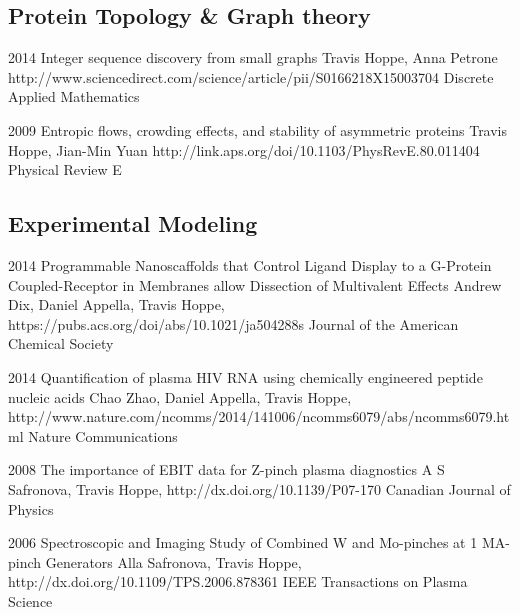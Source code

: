 \documentclass[]{scrartcl}
\begin{document}
\begin{cleanCV}

\subsection{Protein Topology \& Graph theory}

\Paper
{2014}
{Integer sequence discovery from small graphs}
{Travis Hoppe, Anna Petrone}
{http://www.sciencedirect.com/science/article/pii/S0166218X15003704}
{Discrete Applied Mathematics}

\Paper
{2009}
{Entropic flows, crowding effects, and stability of asymmetric proteins}
{Travis Hoppe, Jian-Min Yuan}
{http://link.aps.org/doi/10.1103/PhysRevE.80.011404}
{Physical Review E}


\subsection{Experimental Modeling}

\Paper
{2014}
{Programmable Nanoscaffolds that Control Ligand Display to a G-Protein Coupled-Receptor in Membranes allow Dissection of Multivalent Effects}
{Andrew Dix, Daniel Appella, Travis Hoppe, \etal}
{https://pubs.acs.org/doi/abs/10.1021/ja504288s}
{Journal of the American Chemical Society}

\Paper
{2014}
{Quantification of plasma HIV RNA using chemically engineered peptide nucleic acids}
{Chao Zhao, Daniel Appella, Travis Hoppe, \etal}
{http://www.nature.com/ncomms/2014/141006/ncomms6079/abs/ncomms6079.html}
{Nature Communications}

\Paper
{2008}
{The importance of EBIT data for Z-pinch plasma diagnostics}
{A S Safronova, Travis Hoppe, \etal}
{http://dx.doi.org/10.1139/P07-170}
{Canadian Journal of Physics}

\Paper
{2006}
{Spectroscopic and Imaging Study of Combined W and Mo-pinches 
  at 1 MA-pinch Generators}
{Alla Safronova, Travis Hoppe, \etal}
{http://dx.doi.org/10.1109/TPS.2006.878361}
{IEEE Transactions on Plasma Science}





\end{cleanCV}
\end{document}
